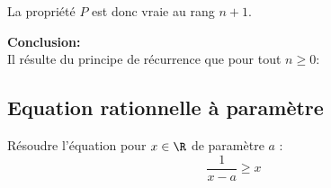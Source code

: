 \begin{correction}
\begin{enumerate}
La propriété $P$ est donc vraie au rang $n+1$.

\textbf{Conclusion:}\\
Il r\'esulte du principe de r\'ecurrence que pour tout $ n\geq 0$:
\begin{center}
\end{center}





\end{enumerate}
\end{correction}






\subsection{Equation rationnelle à paramètre}
\begin{exercice}
Résoudre l'équation pour $x\in \R$ de paramètre $a$  : 
$$\frac{1}{x-a} \geq x$$
\end{exercice}

